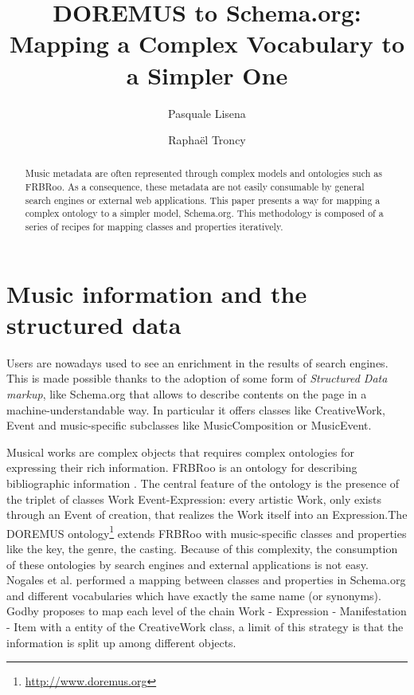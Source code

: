 \documentclass{llncs}
\begin{document}
\title{DOREMUS to Schema.org: Mapping a Complex Vocabulary to a Simpler One}

\author{Pasquale Lisena \and Rapha\"el Troncy}

\maketitle


\begin{abstract}
Music metadata are often represented through complex models and ontologies such as FRBRoo. As a consequence, these metadata are not easily consumable by general search engines or external web applications. This paper presents a way for mapping a complex ontology to a simpler model, Schema.org. This methodology is composed of a series of recipes for mapping classes and properties iteratively.

\end{abstract}


\section{Music information and the structured data}
\label{sec:introduction}

Users are nowadays used to see an enrichment in the results of search engines. This is made possible thanks to the adoption of some form of \textit{Structured Data markup}, like Schema.org \cite{guha2015schema} that allows to describe contents on the page in a machine-understandable way. In particular it offers classes like CreativeWork, Event and music-specific subclasses like MusicComposition or MusicEvent.

Musical works are complex objects that requires complex ontologies for expressing their rich information. FRBRoo is an ontology for describing bibliographic information \cite{doerr2008frbroo}. The central feature of the ontology is the presence of the triplet of classes Work Event-Expression: every artistic Work, only exists through an Event of creation, that realizes the Work itself into an Expression.The DOREMUS ontology\footnote{\url{http://www.doremus.org}} \cite{achichidoremus} extends FRBRoo with music-specific classes and properties like the key, the genre, the casting. Because of this complexity, the consumption of these ontologies by search engines and external applications is not easy.
Nogales et al. \cite{nogales2016linking} performed a mapping between classes and properties in Schema.org and different vocabularies which have exactly the same name (or synonyms).
Godby \cite{godby2013relationship} proposes to map each level of the chain Work - Expression - Manifestation - Item with a entity of the CreativeWork class, a limit of this strategy is that the information is split up among different objects.
\end{document}
